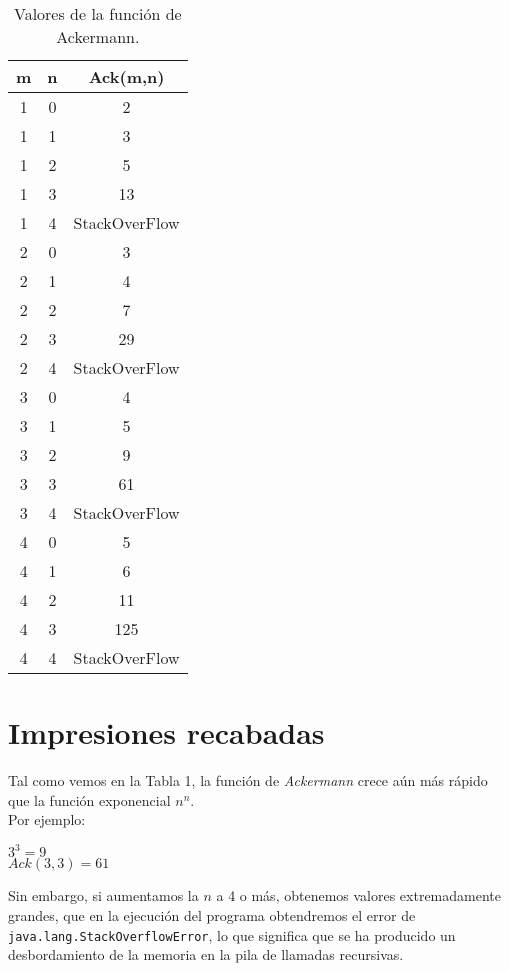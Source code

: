 \documentclass[12pt,letterpaper]{article}
\begin{document}
\begin{center}
\begin{table}[htbp]
	\begin{center}
		\begin{tabular}{|c|c|c|}
			\hline
			\textbf{m} & \textbf{n} & \textbf{Ack(m,n)}  \\
			\hline 
			1 & 0 & 2\\ \hline	
			1 & 1 & 3\\ \hline	
			1 & 2 & 5\\ \hline	
			1 & 3 & 13\\ \hline	
			1 & 4 & StackOverFlow\\ \hline	
			2 & 0 & 3\\ \hline	
			2 & 1 & 4\\ \hline	
			2 & 2 & 7\\ \hline	
			2 & 3 & 29\\ \hline	
			2 & 4 & StackOverFlow\\ \hline	
			3 & 0 & 4\\ \hline	
			3 & 1 & 5\\ \hline	
			3 & 2 & 9\\ \hline
			3 & 3 & 61\\ \hline
			3 & 4 & StackOverFlow\\ \hline
			4 & 0 & 5\\ \hline
			4 & 1 & 6\\ \hline
			4 & 2 & 11\\ \hline
			4 & 3 & 125\\ \hline
			4 & 4 & StackOverFlow\\ \hline
		\end{tabular}
		\caption{Valores de la función de Ackermann.}
		\label{tabla:Valores de la función de Ackermann}
	\end{center}
\end{table}
\end{center}

\section{Impresiones recabadas}
\noindent
Tal como vemos en la Tabla 1, la función de \textit{Ackermann} crece aún más rápido que la función exponencial $n^n$.\\
Por ejemplo:
\begin{center}
	$3^3=9$\\
	$Ack(3,3)=61$
\end{center}
Sin embargo, si aumentamos la $n$ a 4 o más, obtenemos valores extremadamente grandes, que en la ejecución del programa obtendremos el error de \texttt{java.lang.StackOverflowError}, lo que significa que se ha producido un desbordamiento de la memoria en la pila de llamadas recursivas.
\end{document}

